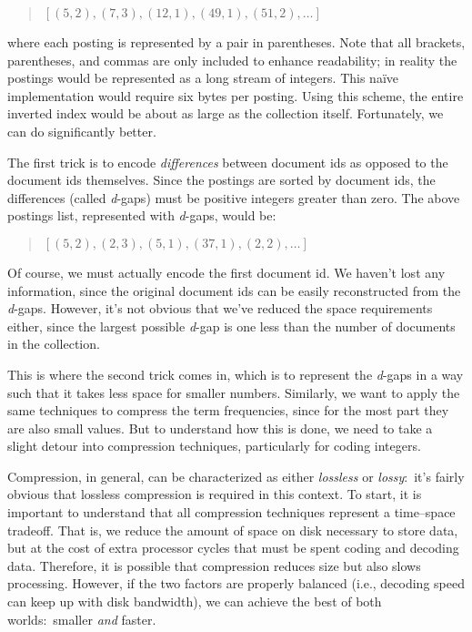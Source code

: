 \begin{quote}
$[ (5, 2), (7, 3), (12, 1), (49, 1), (51, 2), \ldots]$
\end{quote}

\noindent where each posting is represented by a pair in parentheses.
Note that all brackets, parentheses, and commas are only included to
enhance readability; in reality the postings would be represented as a
long stream of integers.  This na\"ive implementation would require
six bytes per posting.  Using this scheme, the entire inverted index
would be about as large as the collection itself.  Fortunately, we can
do significantly better.

The first trick is to encode \emph{differences} between document ids as
opposed to the document ids themselves.  Since the postings are sorted
by document ids, the differences (called \emph{d}-gaps) must be
positive integers greater than zero.  The above postings list,
represented with \emph{d}-gaps, would be:

\begin{quote}
$[ (5, 2), (2, 3), (5, 1), (37, 1), (2, 2), \ldots]$
\end{quote}

\noindent Of course, we must actually encode the first document id.
We haven't lost any information, since the original document ids can
be easily reconstructed from the \emph{d}-gaps.  However, it's not
obvious that we've reduced the space requirements either, since the
largest possible \emph{d}-gap is one less than the number of documents
in the collection.

This is where the second trick comes in, which is to represent the
\emph{d}-gaps in a way such that it takes less space for smaller
numbers.  Similarly, we want to apply the same techniques to compress
the term frequencies, since for the most part they are also small
values.  But to understand how this is done, we need to take a slight
detour into compression techniques, particularly for coding integers.

Compression, in general, can be characterized as either \emph{lossless}
or \emph{lossy}:\ it's fairly obvious that lossless compression is
required in this context.  To start, it is important to understand
that all compression techniques represent a time--space tradeoff.
That is, we reduce the amount of space on disk necessary to store
data, but at the cost of extra processor cycles that must be spent
coding and decoding data.  Therefore, it is possible that compression
reduces size but also slows processing.  However, if the two factors
are properly balanced (i.e., decoding speed can keep up with disk
bandwidth), we can achieve the best of both worlds:\ smaller \emph{and}
faster.

